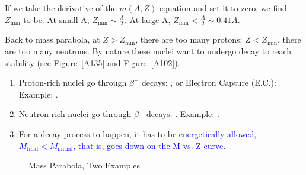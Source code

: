 \documentclass{school-22.101-notes}
\begin{document}
If we take the derivative of the $m(A,Z)$ equation and set it to zero, we find $Z_{\mathrm{min}}$ to be: 
At small A, $Z_{\mathrm{min}} \sim \frac{A}{2}$. At large A, $Z_{\mathrm{min}} < \frac{A}{2} \sim 0.41 A$. 

Back to mass parabola, at $Z > Z_{\mathrm{min}}$, there are too many protons; $Z < Z_{\mathrm{min}}$, there are too many neutrons. By nature these nuclei want to undergo decay to reach stability (see Figure~\ref{A135} and Figure~\ref{A102}). 
\begin{enumerate}
\item Proton-rich nuclei go through $\beta^+$ decays: , or Electron Capture (E.C.): . Example: . 
\item Neutron-rich nuclei go through $\beta^-$ decays: . Example: .
\item For a decay process to happen, it has to be \textcolor{blue}{energetically allowed, $M_{\mathrm{final}} < M_{\mathrm{initial}}$, that is, goes down on the M vs. Z curve.}
\end{enumerate}
\begin{figure}
  \centering
  \caption{Mass Parabola, Two Examples}
\end{figure}
\end{document}
